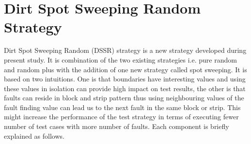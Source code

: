 \documentclass[conference]{IEEEtran}
\begin{document}

\section{Dirt Spot Sweeping Random Strategy}
Dirt Spot Sweeping Random (DSSR) strategy is a new strategy developed during present study. It is combination of the two existing strategies i.e. pure random and random plus with the addition of one new strategy called spot sweeping. It is based on two intuitions. One is that boundaries have interesting values and using these values in isolation can provide high impact on test results, the other is that faults can reside in block and strip pattern thus using neighbouring values of the fault finding value can lead us to the next fault in the same block or strip. This might increase the performance of the test strategy in terms of executing fewer number of test cases with more number of faults. Each component is briefly explained as follows.
\end{document}
